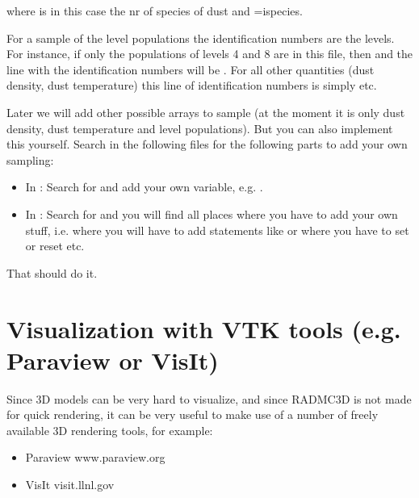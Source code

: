 \documentclass[letterpaper,10pt,english]{sphinxmanual}
\begin{document}
where  is in this case the nr of species of dust and
=\textasciigrave{}\textasciigrave{}ispecies\textasciigrave{}\textasciigrave{}.

For a sample of the level populations the identification numbers are the
levels. For instance, if only the populations of levels 4 and 8 are in this
file, then  and the line with the identification numbers
will be . For all other quantities (dust density, dust
temperature) this line of identification numbers is simply 
etc.

Later we will add other possible arrays to sample (at the moment it is only
dust density, dust temperature and level populations). But you can also
implement this yourself. Search in the following files for the following
parts to add your own sampling:
\begin{itemize}
\item {} 
In : Search for  and add your
own variable, e.g. .

\item {} 
In : Search for  and you will find all
places where you have to add your own stuff, i.e.  where you will have to add
statements like  or where you have to set
 or reset  etc.

\end{itemize}

That should do it.


\chapter{Visualization with VTK tools (e.g. Paraview or VisIt)}
\label{\detokenize{vtkoutput:visualization-with-vtk-tools-e-g-paraview-or-visit}}\label{\detokenize{vtkoutput:chap-vtk-output}}\label{\detokenize{vtkoutput::doc}}
Since 3\sphinxhyphen{}D models can be very hard to visualize, and since RADMC\sphinxhyphen{}3D is not
made for quick rendering, it can be very useful to make use of a number of
freely available 3\sphinxhyphen{}D rendering tools, for example:
\begin{itemize}
\item {} 
Paraview www.paraview.org

\item {} 
VisIt visit.llnl.gov

\end{itemize}
\end{document}
